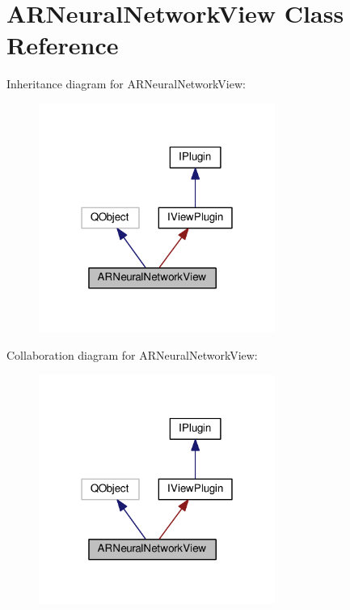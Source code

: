 \hypertarget{class_a_r_neural_network_view}{}\section{A\+R\+Neural\+Network\+View Class Reference}
\label{class_a_r_neural_network_view}


Inheritance diagram for A\+R\+Neural\+Network\+View\+:\nopagebreak
\begin{figure}[H]
\begin{center}
\leavevmode
\includegraphics[width=219pt]{class_a_r_neural_network_view__inherit__graph}
\end{center}
\end{figure}


Collaboration diagram for A\+R\+Neural\+Network\+View\+:\nopagebreak
\begin{figure}[H]
\begin{center}
\leavevmode
\includegraphics[width=219pt]{class_a_r_neural_network_view__coll__graph}
\end{center}
\end{figure}
